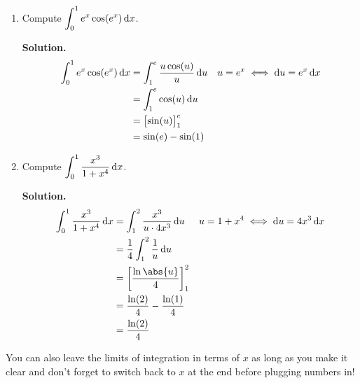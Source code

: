 \begin{Example}{}{}
    \begin{enumerate}[label=(\roman*)]
        \item Compute $ \displaystyle  \int_{0}^{1} e^x\cos(e^x)\odif{x} $.

              \textbf{Solution.}
              \begin{align*}
                  \int_{0}^{1} e^x\cos(e^x)\odif{x}
                   & =\int_{1}^{e}\frac{u\cos(u)}{u} \odif{u} &  & u=e^x\iff \odif{u}=e^x\odif{x} \\
                   & =\int_{1}^{e} \cos(u)\odif{u}                                                \\
                   & =\bigl[\sin(u)\bigr]_{1}^e                                                   \\
                   & =\sin(e)-\sin(1)
              \end{align*}
        \item Compute $ \displaystyle \int_{0}^{1} \frac{x^3}{1+x^4} \odif{x} $.

              \textbf{Solution.}
              \begin{align*}
                  \int_{0}^{1} \frac{x^3}{1+x^4} \odif{x}
                   & =\int_{1}^{2} \frac{x^3}{u\cdot4x^3}\odif{u}   &  & u=1+x^4\iff \odif{u}=4x^3\odif{x} \\
                   & =\frac{1}{4} \int_{1}^{2} \frac{1}{u} \odif{u}                                        \\
                   & =\left[ \frac{\ln\abs{u}}{4}  \right]_{1}^2                                           \\
                   & =\frac{\ln(2)}{4} -\frac{\ln(1)}{4}                                                   \\
                   & =\frac{\ln(2)}{4}
              \end{align*}
    \end{enumerate}
\end{Example}

\begin{Remark}{}{}
    You can also leave the limits of integration in terms of $ x $ as long as
    you make it clear and don't forget to switch back to $ x $ at the end before
    plugging numbers in!
\end{Remark}

